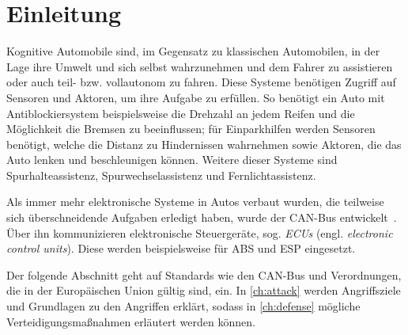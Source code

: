 
\section{Einleitung}
Kognitive Automobile sind, im Gegensatz zu klassischen Automobilen, in der Lage
ihre Umwelt und sich selbst wahrzunehmen und dem Fahrer zu assistieren oder
auch teil- bzw. vollautonom zu fahren. Diese Systeme benötigen Zugriff auf
Sensoren und Aktoren, um ihre Aufgabe zu erfüllen. So benötigt ein Auto mit
Antiblockiersystem beispielsweise die Drehzahl an jedem Reifen und die
Möglichkeit die Bremsen zu beeinflussen; für Einparkhilfen werden Sensoren
benötigt, welche die Distanz zu Hindernissen wahrnehmen sowie Aktoren, die das
Auto lenken und beschleunigen können. Weitere dieser Systeme sind
Spurhalteassistenz, Spurwechselassistenz und Fernlichtassistenz.

%   
%

%
%



Als immer mehr elektronische Systeme in Autos verbaut wurden, die teilweise
sich überschneidende Aufgaben erledigt haben, wurde der CAN-Bus
entwickelt~\cite{Kiencke1986}. Über ihn kommunizieren elektronische
Steuergeräte, sog. \textit{ECUs} (engl. \textit{electronic control units}).
Diese werden beispielsweise für ABS und ESP eingesetzt.

%   


Der folgende Abschnitt geht auf Standards wie den CAN-Bus und Verordnungen, die
in der Europäischen Union gültig sind, ein. In \cref{ch:attack} werden
Angriffsziele und Grundlagen zu den Angriffen erklärt, sodass in
\cref{ch:defense} mögliche Verteidigungsmaßnahmen erläutert werden können.
